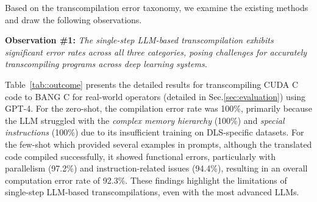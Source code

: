 Based on the transcompilation error taxonomy, we examine the existing methods and draw the following observations.

\textbf{Observation \#1:} \emph{The single-step LLM-based transcompilation exhibits significant error rates across all three categories, posing challenges for accurately transcompiling programs across deep learning systems.}

Table~\ref{tab::outcome} presents the detailed results for transcompiling CUDA C code to BANG C for real-world operators (detailed in Sec.\ref{sec:evaluation}) using GPT-4. For the zero-shot, the compilation error rate was 100\%, primarily because the LLM struggled with the \emph{complex memory hierarchy} (100\%) and \emph{special instructions} (100\%) due to its insufficient training on DLS-specific datasets. For the few-shot which provided several examples in prompts, although the translated code compiled successfully, it showed functional errors, particularly with parallelism (97.2\%) and instruction-related issues (94.4\%), resulting in an overall computation error rate of 92.3\%. These findings highlight the limitations of single-step LLM-based transcompilations, even with the most advanced LLMs.


\begin{table}[!ht]
\vspace{-5pt}
    \caption{\small Breakdown of the unsuccessful transcompilations produced by GPT-4 based on outcome.(\%)}
    \label{tab::outcome}
    \centering
    \vspace{-5pt}
    \scriptsize
    \setlength{\tabcolsep}{1pt}
\vspace{-5pt}
\end{table}


